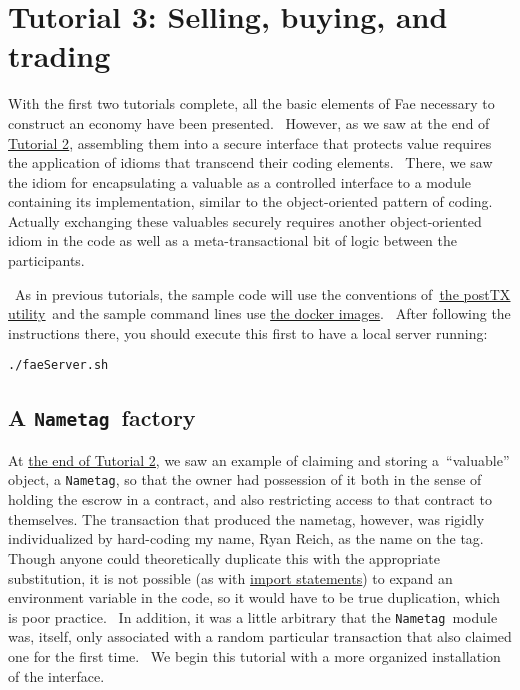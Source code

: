 \documentclass[11pt]{article}
\newcommand{\codeblock}[1]{\begin{mdframed}[
    backgroundcolor=header-color,
    linecolor=header-color,
    innertopmargin=10pt,
    ]{\texttt{#1}}\end{mdframed}}
\DeclareRobustCommand{\fuline}[1]{\texorpdfstring{\uline{#1}}{#1}}
\begin{document}
\section{Tutorial 3: Selling, buying, and trading}
\vspace{5.5pt}

With the first two tutorials complete, all the basic elements of Fae necessary to construct an economy have been presented.  However, as we saw at the end of \href{https://consensys.quip.com/2wGTAw6Fgm87/Tutorial-2-Escrows}{\fuline{Tutorial 2}}, assembling them into a secure interface that protects value requires the application of idioms that transcend their coding elements.  There, we saw the idiom for encapsulating a valuable as a controlled interface to a module containing its implementation, similar to the object-oriented pattern of coding.  Actually exchanging these valuables securely requires another object-oriented idiom in the code as well as a meta-transactional bit of logic between the participants.


\vspace{11pt}

 As in previous tutorials, the sample code will use the conventions of \href{https://consensys.quip.com/kN9MAhiNm8dz/Project-information\%23GTTACAArd2o}{\fuline{the postTX utility}} and the sample command lines use \href{https://consensys.quip.com/kN9MAhiNm8dz/Project-information\%23GTTACAfd57C}{\fuline{the docker images}}.  After following the instructions there, you should execute this first to have a local server running:

\codeblock{.\slash{}faeServer.sh}

\subsection{A \texttt{Nametag} factory}
\vspace{5.5pt}

At \href{https://consensys.quip.com/2wGTAw6Fgm87/Tutorial-2-Escrows}{\fuline{the end of Tutorial 2}}, we saw an example of claiming and storing a “valuable” object, a \texttt{Nametag}, so that the owner had possession of it both in the sense of holding the escrow in a contract, and also restricting access to that contract to themselves. The transaction that produced the nametag, however, was rigidly individualized by hard-coding my name, Ryan Reich, as the name on the tag.  Though anyone could theoretically duplicate this with the appropriate substitution, it is not possible (as with \href{https://consensys.quip.com/2wGTAw6Fgm87/Tutorial-2-Escrows\%23ZRIACAkHHsZ}{\fuline{import statements}}) to expand an environment variable in the code, so it would have to be true duplication, which is poor practice.  In addition, it was a little arbitrary that the \texttt{Nametag} module was, itself, only associated with a random particular transaction that also claimed one for the first time.  We begin this tutorial with a more organized installation of the interface.
\end{document}
